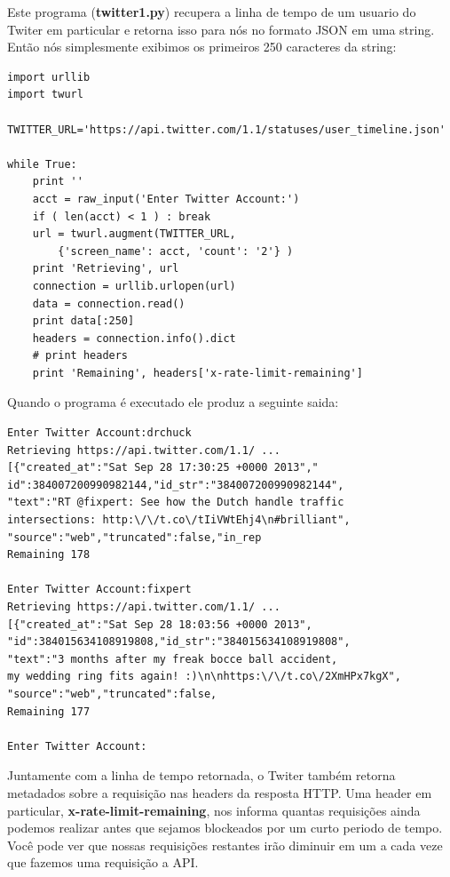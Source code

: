 Este programa ({\bf twitter1.py}) recupera a linha de tempo
de um usuario do Twiter em particular e retorna isso para nós
no formato JSON em uma string. Então nós simplesmente exibimos
os primeiros 250 caracteres da string:

\beforeverb
\begin{verbatim}
import urllib
import twurl

TWITTER_URL='https://api.twitter.com/1.1/statuses/user_timeline.json'

while True:
    print ''
    acct = raw_input('Enter Twitter Account:')
    if ( len(acct) < 1 ) : break
    url = twurl.augment(TWITTER_URL,
        {'screen_name': acct, 'count': '2'} )
    print 'Retrieving', url
    connection = urllib.urlopen(url)
    data = connection.read()
    print data[:250]
    headers = connection.info().dict
    # print headers
    print 'Remaining', headers['x-rate-limit-remaining']
\end{verbatim}
\afterverb
%
Quando o programa é executado ele produz a seguinte saida:
 
\beforeverb
\begin{verbatim}
Enter Twitter Account:drchuck
Retrieving https://api.twitter.com/1.1/ ...
[{"created_at":"Sat Sep 28 17:30:25 +0000 2013","
id":384007200990982144,"id_str":"384007200990982144",
"text":"RT @fixpert: See how the Dutch handle traffic 
intersections: http:\/\/t.co\/tIiVWtEhj4\n#brilliant",
"source":"web","truncated":false,"in_rep
Remaining 178

Enter Twitter Account:fixpert
Retrieving https://api.twitter.com/1.1/ ...
[{"created_at":"Sat Sep 28 18:03:56 +0000 2013",
"id":384015634108919808,"id_str":"384015634108919808",
"text":"3 months after my freak bocce ball accident, 
my wedding ring fits again! :)\n\nhttps:\/\/t.co\/2XmHPx7kgX",
"source":"web","truncated":false,
Remaining 177

Enter Twitter Account:
\end{verbatim}
\afterverb
%
Juntamente com a linha de tempo retornada, o Twiter também 
retorna metadados sobre a requisição nas headers da resposta HTTP.
Uma header em particular, {\bf x-rate-limit-remaining}, nos 
informa quantas requisições ainda podemos realizar antes que sejamos
blockeados por um curto periodo de tempo. Você pode ver que nossas
requisições restantes irão diminuir em um a cada veze que fazemos 
uma requisição a API.

